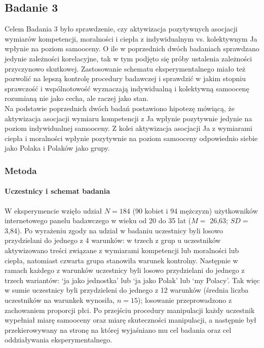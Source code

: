 \documentclass[man]{apa6}
\begin{document}
\newpage
\subsection{Badanie 3}
Celem Badania 3 było sprawdzenie, czy aktywizacja pozytywnych asocjacji wymiarów kompetencji, moralności i ciepła z indywidualnym vs. kolektywnym Ja wpłynie na poziom samooceny. O ile w poprzednich dwóch badaniach sprawdzano jedynie zależności korelacyjne, tak w tym podjęto się próby ustalenia zależności przyczynowo skutkowej. Zastosowanie schematu eksperymentalnego miało też pozwolić na lepszą kontrolę procedury badawczej i sprawdzić w jakim stopniu sprawczość i wspólnotowość wyznaczają indywidualną i kolektywną samoocenę rozumianą nie jako cecha, ale raczej jako stan.\\
Na podstawie poprzednich dwóch badań postawiono hipotezę mówiącą, że aktywizacja asocjacji wymiaru kompetencji z Ja wpłynie pozytywnie jedynie na poziom indywidualnej samooceny. Z kolei aktywizacja asocjacji Ja z wymiarami ciepła i moralności wpłynie pozytywnie na poziom samooceny odpowiednio siebie jako Polaka i Polaków jako grupy. \\

\subsubsection{Metoda}

\paragraph{Uczestnicy i schemat badania}
W eksperymencie wzięło udział $N = 184$ (90 kobiet i 94 mężczyzn) użytkowników internetowego panelu badawczego w wieku od 20 do 35 lat ($M =$ 26,63; $SD =$ 3,84). Po wyrażeniu zgody na udział w badaniu uczestnicy byli losowo przydzielani do jednego z 4 warunków: w trzech z grup u uczestników aktywizowano treści związane z wymiarami kompetencji lub moralności lub ciepła, natomiast czwarta grupa stanowiła warunek kontrolny. Następnie w ramach każdego z warunków uczestnicy byli losowo przydzielani do jednego z trzech wariantów: `ja jako jednostka' lub `ja jako Polak' lub `my Polacy'. Tak więc w sumie uczestnicy byli przydzieleni do jednego z 12 warunków (średnia liczba uczestników na warunkek wynosiła, $n = 15$); losowanie przeprowadzono z zachowaniem proporcji płci. Po przejściu procedury manipulacji każdy uczestnik wypełniał miarę samooceny oraz miarę skuteczności manipulacji, a następnie był przekierowywany na stronę na której wyjaśniano mu cel badania oraz cel oddziaływania eksperymentalnego.
\end{document}
